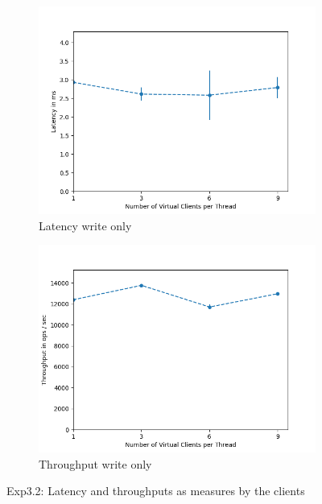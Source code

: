 \documentclass[11pt,a4paper]{article}
\begin{document}
\begin{figure}[H]
\centering
\begin{subfigure}{.5\textwidth}
    \centering
    \includegraphics[width=\textwidth]{img/exp5_1/exp5_1__client_latency_sharding_False.png}
    \caption{Latency write only}
    \label{fig:mesh1}
\end{subfigure}%
\begin{subfigure}{.5\textwidth}
      \centering
    \includegraphics[width=\textwidth]{img/exp5_1/exp5_1__client_throughput_sharding_False.png}
    \caption{Throughput write only}
    \label{fig:mesh1}
\end{subfigure}
\caption{Exp3.2: Latency and throughputs as measures by the clients}
\label{fig:test}
\end{figure}
\end{document}
